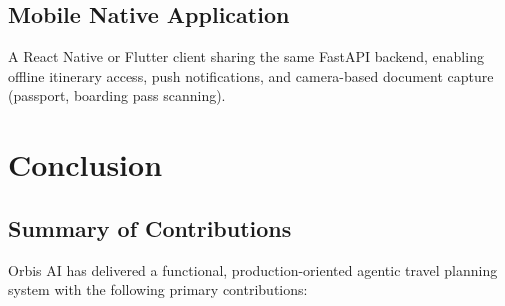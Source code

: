 \documentclass[12pt, a4paper]{article}
\begin{document}
\subsection{Mobile Native Application}

A React Native or Flutter client sharing the same FastAPI backend, enabling offline itinerary access, push notifications, and camera-based document capture (passport, boarding pass scanning).

\section{Conclusion}

\subsection{Summary of Contributions}

Orbis AI has delivered a functional, production-oriented agentic travel planning system with the following primary contributions:
\end{document}
